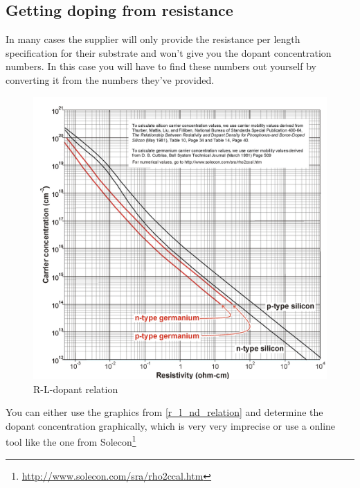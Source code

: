 \subsection{Getting doping from resistance}
In many cases the supplier will only provide the resistance per length specification for their substrate and won't give you the dopant concentration numbers.
In this case you will have to find these numbers out yourself by converting it from the numbers they've provided.

\begin{figure}[H]
	\centering
	\includegraphics[width=\textwidth]{resistance_doping.png}
	\caption{R-L-dopant relation}
	\label{r_l_nd_relation}
\end{figure}

You can either use the graphics from \autoref{r_l_nd_relation} and determine the dopant concentration graphically, which is very very imprecise or use a online tool like the one from Solecon\footnote{\url{http://www.solecon.com/sra/rho2ccal.htm}}